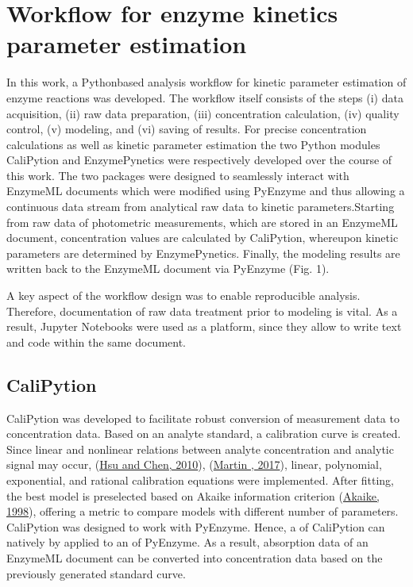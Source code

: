 \documentclass[letterpaper,12pt,english]{jupyterBook}
\begin{document}
\section{Workflow for enzyme kinetics parameter estimation}
\label{\detokenize{results:workflow-for-enzyme-kinetics-parameter-estimation}}
\sphinxAtStartPar
In this work, a Python\sphinxhyphen{}based analysis workflow for kinetic parameter estimation of enzyme reactions was developed. The workflow itself consists of the steps (i) data acquisition, (ii) raw data preparation, (iii) concentration calculation, (iv) quality control, (v) modeling, and (vi) saving of results. For precise concentration calculations as well as kinetic parameter estimation the two Python modules CaliPytion and EnzymePynetics were respectively developed over the course of this work.
The two packages were designed to seamlessly interact with EnzymeML documents which were modified using PyEnzyme and thus allowing a continuous data stream from analytical raw data to kinetic parameters.Starting from raw data of photometric measurements, which are stored in an EnzymeML document, concentration values are calculated by CaliPytion, whereupon kinetic parameters are determined by EnzymePynetics. Finally, the modeling results are written back to the EnzymeML document via PyEnzyme (Fig. 1).

\sphinxAtStartPar
{}

\sphinxAtStartPar
A key aspect of the workflow design was to enable reproducible analysis. Therefore, documentation of raw data treatment prior to modeling is vital. As a result, Jupyter Notebooks were used as a platform, since they allow to write text and code within the same document.


\subsection{CaliPytion}
\label{\detokenize{results:calipytion}}
\sphinxAtStartPar
CaliPytion was developed to facilitate robust conversion of measurement data to concentration data. Based on an analyte standard, a calibration curve is created. Since linear and non\sphinxhyphen{}linear relations between analyte concentration and analytic signal may occur, (\hyperlink{cite.references:id14}{Hsu and Chen, 2010}), (\hyperlink{cite.references:id15}{Martin , 2017}), linear, polynomial, exponential, and rational calibration equations were implemented. After fitting, the best model is preselected based on Akaike information criterion (\hyperlink{cite.references:id17}{Akaike, 1998}), offering a metric to compare models with different number of parameters. CaliPytion was designed to work with PyEnzyme. Hence, a  of CaliPytion can natively by applied to an  of PyEnzyme. As a result, absorption data of an EnzymeML document can be converted into concentration data based on the previously generated standard curve.
\end{document}
